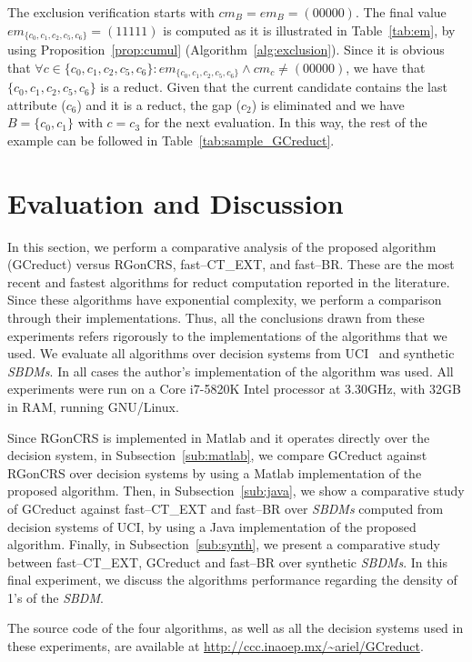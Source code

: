 \documentclass[letterpaper, twoside, openright, 12pt]{book}%
\begin{document}
	The exclusion verification starts with $cm_B = em_B = (00000)$. The final value $em_{\lbrace c_0,c_1,c_2,c_5,c_6\rbrace}=(11111)$ is computed as it is illustrated in Table~\ref{tab:em}, by using Proposition~\ref{prop:cumul} (Algorithm~\ref{alg:exclusion}). Since it is obvious that $\forall c \in \lbrace c_0,c_1,c_2,c_5,c_6\rbrace : em_{\lbrace c_0,c_1,c_2,c_5,c_6\rbrace}\wedge cm_c \neq (00000)$, we have that $\lbrace c_0,c_1,c_2,c_5,c_6\rbrace$ is a reduct. Given that the current candidate contains the last attribute ($c_6$) and it is a reduct, the gap ($c_2$) is eliminated and we have $B = \lbrace c_0,c_1\rbrace$ with $c=c_3$ for the next evaluation. In this way, the rest of the example can be followed in Table~\ref{tab:sample_GCreduct}.

%
\section{Evaluation and Discussion}\label{GC_evaluation}
%
	In this section, we perform a comparative analysis of the proposed algorithm (GCreduct) versus RGonCRS, fast--CT\_EXT, and fast--BR. These are the most recent and fastest algorithms for reduct computation reported in the literature. Since these algorithms have exponential complexity, we perform a comparison through their implementations. Thus, all the conclusions drawn from these experiments refers rigorously to the implementations of the algorithms that we used. We evaluate all algorithms over decision systems from UCI~\cite{Bache13} and synthetic \textit{SBDMs}. In all cases the author's implementation of the algorithm was used. All experiments were run on a Core i7-5820K Intel processor at 3.30GHz, with 32GB in RAM, running GNU/Linux.
	
	Since RGonCRS is implemented in Matlab and it operates directly	over the decision system, in Subsection~\ref{sub:matlab}, we compare GCreduct against RGonCRS over decision systems by using a Matlab implementation of the proposed algorithm. Then, in Subsection~\ref{sub:java}, we show a comparative study of GCreduct against fast--CT\_EXT and fast--BR over \textit{SBDMs} computed from decision systems of UCI, by using a Java implementation of the proposed algorithm. Finally, in Subsection~\ref{sub:synth}, we present a comparative study between fast--CT\_EXT, GCreduct and fast--BR over synthetic \textit{SBDMs}. In this final experiment, we discuss the algorithms performance regarding the density of 1's of the \textit{SBDM}. 
	
	The source code of the four algorithms, as well as all the decision systems used in these experiments, are available at \url{http://ccc.inaoep.mx/~ariel/GCreduct}.
	
\end{document}
